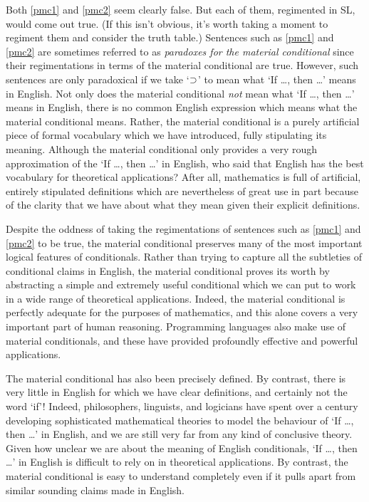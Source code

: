 Both \ref{pmc1} and \ref{pmc2} seem clearly false.
But each of them, regimented in SL, would come out true.
(If this isn't obvious, it's worth taking a moment to regiment them and consider the truth table.) 
Sentences such as \ref{pmc1} and \ref{pmc2} are sometimes referred to as \textit{paradoxes for the material conditional} since their regimentations in terms of the material conditional are true.
However, such sentences are only paradoxical if we take `$\supset$' to mean what `If \ldots, then \ldots' means in English.
Not only does the material conditional \textit{not} mean what `If \ldots, then \ldots' means in English, there is no common English expression which means what the material conditional means.
Rather, the material conditional is a purely artificial piece of formal vocabulary which we have introduced, fully stipulating its meaning.
Although the material conditional only provides a very rough approximation of the `If \ldots, then \ldots' in English, who said that English has the best vocabulary for theoretical applications?
After all, mathematics is full of artificial, entirely stipulated definitions which are nevertheless of great use in part because of the clarity that we have about what they mean given their explicit definitions.

Despite the oddness of taking the regimentations of sentences such as \ref{pmc1} and \ref{pmc2} to be true, the material conditional preserves many of the most important logical features of conditionals.
Rather than trying to capture all the subtleties of conditional claims in English, the material conditional proves its worth by abstracting a simple and extremely useful conditional which we can put to work in a wide range of theoretical applications.
Indeed, the material conditional is perfectly adequate for the purposes of mathematics, and this alone covers a very important part of human reasoning.
Programming languages also make use of material conditionals, and these have provided profoundly effective and powerful applications.

The material conditional has also been precisely defined.
By contrast, there is very little in English for which we have clear definitions, and certainly not the word `if'!
Indeed, philosophers, linguists, and logicians have spent over a century developing sophisticated mathematical theories to model the behaviour of `If \ldots, then \ldots' in English, and we are still very far from any kind of conclusive theory.
Given how unclear we are about the meaning of English conditionals, `If \ldots, then \ldots' in English is difficult to rely on in theoretical applications.
By contrast, the material conditional is easy to understand completely even if it pulls apart from similar sounding claims made in English.

